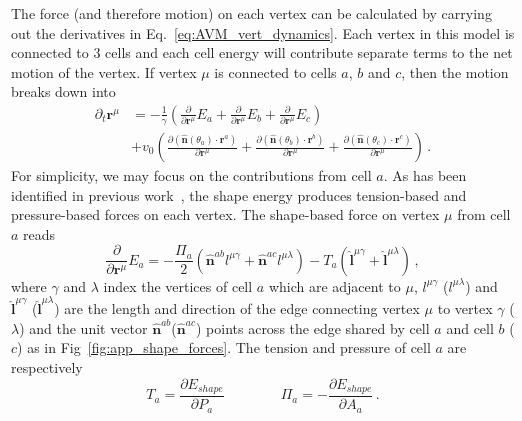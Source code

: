 \documentclass[
reprint
,aps
,amssymb
,amsmath
,superscriptaddress
]{revtex4-1}
\begin{document}
The force (and therefore motion) on each vertex can be calculated by carrying out the derivatives in Eq.~\ref{eq:AVM_vert_dynamics}. Each vertex in this model is connected to 3 cells and each cell energy will contribute separate terms to the net motion of the vertex. If vertex $\mu$ is connected to cells $a$, $b$ and $c$, then the motion breaks down into
%
\begin{equation}
\begin{aligned}\label{eq:AVM_vert_dynamics2}
\partial_t \mathbf{r}^\mu& = -\frac{1}{\gamma} \left( \frac{\partial}{\partial\mathbf{r}^\mu} E_a + \frac{\partial}{\partial\mathbf{r}^\mu} E_b + \frac{\partial}{\partial\mathbf{r}^\mu} E_c  \right) \\ & + v_0 \left( \frac{\partial (\mathbf{\hat{n}}(\theta_a) \cdot \mathbf{r}^a) }{\partial \mathbf{r}^\mu} + \frac{\partial (\mathbf{\hat{n}}(\theta_b) \cdot \mathbf{r}^b)}{\partial \mathbf{r}^\mu} + \frac{\partial (\mathbf{\hat{n}}(\theta_c) \cdot \mathbf{r}^c )}{\partial \mathbf{r}^\mu} \right)\, .
\end{aligned}
\end{equation}
%
For simplicity, we may focus on the contributions from cell $a$. As has been identified in previous work~\cite{Yang2017}, the shape energy produces tension-based and pressure-based forces on each vertex. The shape-based force on vertex $\mu$ from cell $a$ reads
%
\begin{equation}\label{eq:AVM_vertex_shape_force}
\frac{\partial}{\partial\mathbf{r}^\mu} E_a = -\frac{\Pi_a}{2} (\mathbf{\hat{n}}^{ab} l^{\mu\gamma} + \mathbf{\hat{n}}^{ac} l^{\mu\lambda}) -T_a (\mathbf{\hat{l}}^{\mu\gamma} + \mathbf{\hat{l}}^{\mu\lambda}) \, ,
\end{equation}
%
where $\gamma$ and $\lambda$ index the vertices of cell $a$ which are adjacent to $\mu$, $l^{\mu\gamma}$ ($l^{\mu\lambda}$) and $\mathbf{\hat{l}}^{\mu\gamma}$ ($\mathbf{\hat{l}}^{\mu\lambda}$) are the length and direction of the edge connecting vertex $\mu$ to vertex $\gamma$ ($\lambda$) and the unit vector $\mathbf{\hat{n}}^{ab}$($\mathbf{\hat{n}}^{ac}$) points across the edge shared by cell $a$ and cell $b$ ($c$) as in Fig~\ref{fig:app_shape_forces}. 
The tension and pressure of cell $a$ are respectively
%
\begin{equation}\label{eq:AVM_pressure_tension}
T_a = \frac{\partial E_{shape}}{\partial P_a} \qquad \qquad \Pi_a = - \frac{\partial E_{shape}}{\partial A_a}\, .
\end{equation}
%
\end{document}
